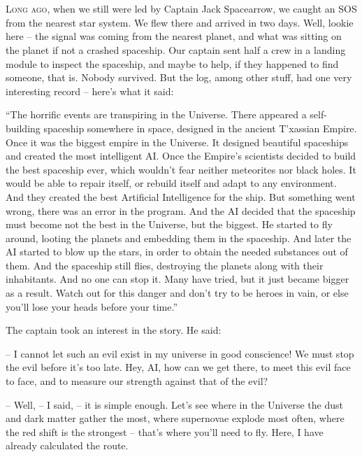 \documentclass[ebook,oneside,final,openright]{memoir}
\begin{document}
\chapter{}
\par
\lettrine{L}{ong ago,} when we still were led by Captain Jack Spacearrow, we caught an SOS from the nearest star system. We flew there and arrived in two days. Well, lookie here – the signal was coming from the nearest planet, and what was sitting on the planet if not a crashed spaceship. Our captain sent half a crew in a landing module to inspect the spaceship, and maybe to help, if they happened to find someone, that is. Nobody survived. But the log, among other stuff, had one very interesting record – here’s what it said:\par
\par
“The horrific events are transpiring in the Universe. There appeared a self-building spaceship somewhere in space, designed in the ancient T’xassian Empire. Once it was the biggest empire in the Universe. It designed beautiful spaceships and created the most intelligent AI. Once the Empire’s scientists decided to build the best spaceship ever, which wouldn’t fear neither meteorites nor black holes. It would be able to repair itself, or rebuild itself and adapt to any environment. And they created the best Artificial Intelligence for the ship. But something went wrong, there was an error in the program. And the AI decided that the spaceship must become not the best in the Universe, but the biggest. He started to fly around, looting the planets and embedding them in the spaceship. And later the AI started to blow up the stars, in order to obtain the needed substances out of them. And the spaceship still flies, destroying the planets along with their inhabitants. And no one can stop it. Many have tried, but it just became bigger as a result. Watch out for this danger and don’t try to be heroes in vain, or else you’ll lose your heads before your time.”\par
\par
The captain took an interest in the story. He said:\par
– I cannot let such an evil exist in my universe in good conscience! We must stop the evil before it’s too late. Hey, AI, how can we get there, to meet this evil face to face, and to measure our strength against that of the evil?\par
– Well, – I said, – it is simple enough. Let’s see where in the Universe the dust and dark matter gather the most, where supernovae explode most often, where the red shift is the strongest – that’s where you’ll need to fly. Here, I have already calculated the route.\par
\end{document}
